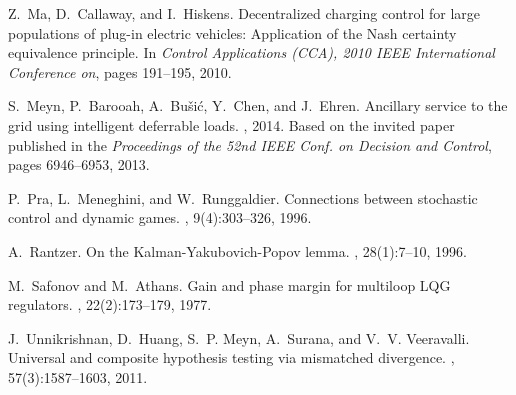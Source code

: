 \documentclass[11pt,twocolumn]{IEEEtran}
\begin{document}
\begin{thebibliography}{10}
Z.~Ma, D.~Callaway, and I.~Hiskens.
\newblock Decentralized charging control for large populations of plug-in
  electric vehicles: Application of the {Nash} certainty equivalence principle.
\newblock In {\em Control Applications (CCA), 2010 IEEE International
  Conference on}, pages 191--195,  2010.


S.~Meyn, P.~Barooah, A.~Bu\v{s}i\'{c}, Y.~Chen, and J.~Ehren.
\newblock Ancillary service to the grid using intelligent deferrable loads.
, 2014.
Based on the invited paper published in the {\em {Proceedings of the 52nd IEEE Conf. on Decision and
  Control}}, pages 6946--6953, 2013.


P.~Pra, L.~Meneghini, and W.~Runggaldier.
\newblock Connections between stochastic control and dynamic games.
, 9(4):303--326,
  1996.



 

A.~Rantzer.
\newblock On the {Kalman-Yakubovich-Popov} lemma.
, 28(1):7--10, 1996.

M.~Safonov and M.~Athans.
\newblock Gain and phase margin for multiloop {LQG} regulators.
, 22(2):173--179, 1977.

J.~Unnikrishnan, D.~Huang, S.~P. Meyn, A.~Surana, and V.~V. Veeravalli.
\newblock Universal and composite hypothesis testing via mismatched divergence.
, 57(3):1587--1603, 2011.

\end{thebibliography}
\end{document}
